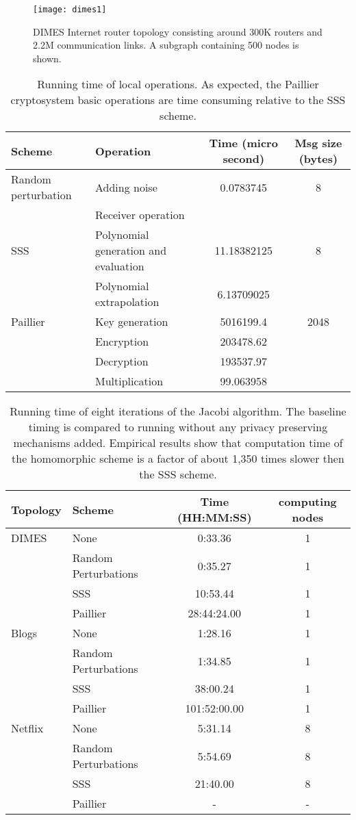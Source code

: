 \documentclass[10pt]{svjour3}
\begin{document}
\begin{figure}
\texttt{[image: dimes1]}\\
  \caption{DIMES Internet router topology consisting around 300K routers and 2.2M communication links. A subgraph containing 500 nodes is shown.}\label{fig:DIMES}
\end{figure}


\begin{table*}[t!]
  \centering
\begin{tabular}{|l|l|c|c|}
\hline
  Scheme & Operation & Time (micro second) & Msg size (bytes)\\ \hline
  Random perturbation & Adding noise & 0.0783745  & 8\\
                     & Receiver operation &  &\\ \hline
  SSS & Polynomial generation and evaluation & 11.18382125 & 8 \\
          & Polynomial extrapolation & 6.13709025 & \\ \hline
  Paillier & Key generation & 5016199.4 & 2048\\
      & Encryption & 203478.62  &\\
 & Decryption & 193537.97   &\\
        & Multiplication & 99.063958 & \\
   \hline
\end{tabular}
  \label{local}
  \caption{Running time of local operations. As expected, the Paillier cryptosystem basic operations
  are time consuming relative to the SSS scheme.}\label{tb2}
\end{table*}

\begin{table*}
  \centering
\begin{tabular}{|l|l|c|c|}
\hline
  Topology & Scheme & Time (HH:MM:SS) & computing nodes\\ \hline
  DIMES & None & 0:33.36 & 1\\
  & Random Perturbations & 0:35.27 & 1\\
         & SSS & 10:53.44 & 1\\
          & Paillier & 28:44:24.00 & 1\\ \hline
  Blogs & None & 1:28.16 & 1\\
        & Random Perturbations & 1:34.85 & 1\\
         & SSS & 38:00.24 & 1\\
          & Paillier & 101:52:00.00 & 1\\ \hline
  Netflix & None & 5:31.14 & 8\\
  & Random Perturbations & 5:54.69 & 8\\
         & SSS & 21:40.00 & 8 \\
          & Paillier & - & -\\
   \hline
\end{tabular}
  \caption{Running time of eight iterations of the Jacobi algorithm. The baseline timing is compared to running without
  any privacy preserving mechanisms added. Empirical results show that computation time of the homomorphic scheme is a factor of about 1,350 times slower
  then the SSS scheme.}\label{tb3}
\end{table*}
\end{document}
